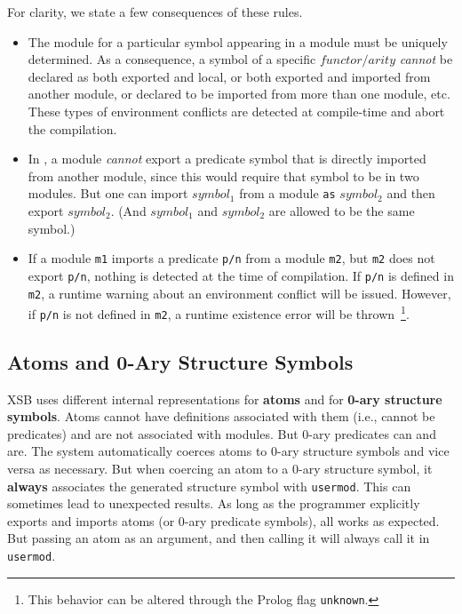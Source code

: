 For clarity, we state a few consequences of these rules.
\begin{itemize}
\item The module for a particular symbol appearing in a module must be
  uniquely determined.  As a consequence, a symbol of a specific
  $functor/arity$ {\em cannot} be declared as both exported and local,
  or both exported and imported from another module, or declared to be
  imported from more than one module, etc.  These types of environment
  conflicts are detected at compile-time and abort the compilation.
%
\item In \version{}, a module {\em cannot} export a predicate symbol
  that is directly imported from another module, since this would
  require that symbol to be in two modules.  But one can import
  $symbol_1$ from a module {\tt as} $symbol_2$ and then export
  $symbol_2$.  (And $symbol_1$ and $symbol_2$ are allowed to be the
  same symbol.)
%
\item If a module {\tt m1} imports a predicate {\tt p/n} from a module
  {\tt m2}, but {\tt m2} does not export {\tt p/n}, nothing is
  detected at the time of compilation.  If {\tt p/n} is defined in
  {\tt m2}, a runtime warning about an environment conflict will be
  issued.  However, if {\tt p/n} is not defined in {\tt m2}, a runtime
  existence error will be thrown~\footnote{This behavior can be
    altered through the Prolog flag {\tt unknown}.}.
\end{itemize}

\subsection{Atoms and 0-Ary Structure Symbols}

XSB uses different internal representations for {\bf atoms} and for
{\bf 0-ary structure symbols}.  Atoms cannot have definitions
associated with them (i.e., cannot be predicates) and are not
associated with modules.  But 0-ary predicates can and are.  The
system automatically coerces atoms to 0-ary structure symbols and vice
versa as necessary.  But when coercing an atom to a 0-ary structure
symbol, it {\bf always} associates the generated structure symbol with
{\tt usermod}.  This can sometimes lead to unexpected results.  As
long as the programmer explicitly exports and imports atoms (or 0-ary
predicate symbols), all works as expected.  But passing an atom as an
argument, and then calling it will always call it in {\tt usermod}.

